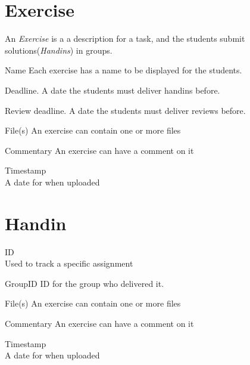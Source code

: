 \documentclass[Main]{subfiles}
\begin{document}

\section{Exercise}
An \textit{Exercise} is a a description for a task, and the students submit solutions(\textit{Handins}) in groups.
\begin{DataIntro}
\rExample{}
\end{DataIntro}

\newpage
\begin{DataTable}

\Record
{Name}
{Each exercise has a name to be displayed for the students.}
{}

\Record
{Deadline.}
{A date the students must deliver handins before.}
{}

\Record
{Review deadline.}
{A date the students must deliver reviews before.}
{}

\Record
{File(s)}
{An exercise can contain one or more files}
{}


\Record
{Commentary}
{An exercise can have a comment on it}
{}


\Record
{Timestamp\\}
{A date for when uploaded}
{}
\end{DataTable}





\section{Handin}

	
\begin{DataIntro}
\rExample{}
\end{DataIntro}

\begin{DataTable}

\Record
{ID\\
Used to track a specific assignment}
{}
{}

\Record
{GroupID}
{ID for the group who delivered it.}
{}

\Record
{File(s)}
{An exercise can contain one or more files}
{}


\Record
{Commentary}
{An exercise can have a comment on it}
{}


\Record
{Timestamp\\}
{A date for when uploaded}
{}
\end{DataTable}
\end{document}
